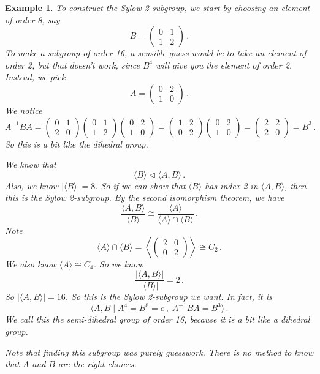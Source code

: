 \documentclass{article}
\theoremstyle{plain}\theoremheaderfont{\normalfont\itshape}\theorembodyfont{\rmfamily}\theoremseparator{.}\newtheorem*{rem}{Remark}\newtheorem*{ex}{Example}\newtheorem*{proof}{Proof}\newtheorem*{altp}{Alternative proof}\newtheorem*{nonex}{Non-Example}
\theoremstyle{plain}\theoremheaderfont{\normalfont\bfseries}\theorembodyfont{\rmfamily}\theoremseparator{.}\newtheorem{thm}{Theorem}[section]\newtheorem{lem}[thm]{Lemma}\newtheorem{prop}[thm]{Proposition}\newtheorem*{cor}{Corollary}\newtheorem{defn}[thm]{Definition}\newtheorem{clm}[thm]{Claim}\newtheorem{clminproof}{Claim}\newtheorem*{notn}{Notation}\newtheorem*{exer}{Exercise}\newtheorem*{lemnn}{Lemma}
\theoremstyle{break}\theoremheaderfont{\normalfont\itshape}\theorembodyfont{\rmfamily}\theoremseparator{.\medskip}\newtheorem*{proofskip}{Proof}\newtheorem*{exs}{Examples}\newtheorem*{rems}{Remarks}\newtheorem*{obs}{Observations}
\theoremstyle{break}\theoremheaderfont{\normalfont\bfseries}\theorembodyfont{\rmfamily}\theoremseparator{.\medskip}\newtheorem{lemskip}[thm]{Lemma}\newtheorem{defnskip}[thm]{Definition}\newtheorem{propskip}[thm]{Proposition}\newtheorem{thmskip}[thm]{Theorem}
\numberwithin{equation}{section}
\newcommand{\abs}[1]{\left|#1\right|}
\begin{document}
\begin{ex}
        To construct the Sylow 2-subgroup, we start by choosing an element of order 8, say
        \[B=\begin{pmatrix}
            0 & 1 \\
            1 & 2
        \end{pmatrix}\,.\]
        To make a subgroup of order 16, a sensible guess would be to take an element of order 2, but that doesn't work, since \(B^4\) will give you the element of order 2. Instead, we pick
        \[A=\begin{pmatrix}
            0 & 2\\
            1 & 0
        \end{pmatrix}\,.\]
        We notice
        \[A^{-1}BA=\begin{pmatrix}
            0 & 1\\
            2 & 0
        \end{pmatrix}\begin{pmatrix}
            0 & 1\\
            1 & 2
        \end{pmatrix}\begin{pmatrix}
            0 & 2\\
            1 & 0
        \end{pmatrix}=\begin{pmatrix}
            1 & 2\\
            0 & 2
        \end{pmatrix}\begin{pmatrix}
            0 & 2\\
            1 & 0
        \end{pmatrix}=\begin{pmatrix}
            2 & 2\\
            2 & 0
        \end{pmatrix}=B^3\,.\]
        So this is a bit like the dihedral group.
      
        We know that
        \[\langle B\rangle \lhd \langle A, B\rangle\,.\]
        Also, we know \(|\langle B\rangle| = 8\). So if we can show that \(\langle B\rangle\) has index 2 in \(\langle A, B\rangle\), then this is the Sylow 2-subgroup. By the second isomorphism theorem, we have
        \[\frac{\langle A,B\rangle}{\langle B\rangle} \cong \frac{\langle A\rangle}{\langle A\rangle\cap\langle B\rangle}\,.\]
        Note
        \[\langle A\rangle\cap\langle B\rangle = \left\langle\begin{pmatrix}
            2 & 0\\
            0 & 2
        \end{pmatrix}\right\rangle\cong C_2\,.\]
        We also know $\langle A\rangle \cong C_4$. So we know
        \[\frac{\abs{\langle A,B\rangle}}{\abs{\langle B\rangle}}=2\,.\]
        So \(\abs{\langle A, B\rangle}=16\). So this is the Sylow 2-subgroup we want. In fact, it is
        \[\langle A,B\mid A^4=B^8=e\,,\; A^{-1}BA = B^3\rangle\,.\]
        We call this the \textit{semi-dihedral group} of order 16, because it is a bit like a dihedral group.
      
        Note that finding this subgroup was purely guesswork. There is no method to know that \(A\) and \(B\) are the right choices.
    \end{ex}
\end{document}
